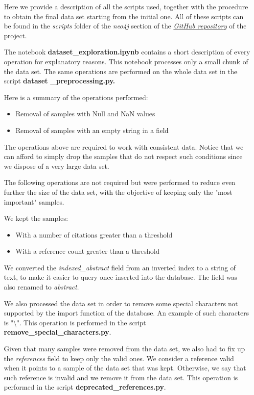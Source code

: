 \documentclass{Configuration_Files/PoliMi3i_thesis}
\begin{document}
Here we provide a description of all the scripts used, together with the procedure to obtain the final data set starting from the initial one. All of these scripts can be found in the \textit{scripts} folder of the \textit{neo4j} section of the \href{https://github.com/albertopirillo/smbud-project-2022}{\textit{GitHub repository}} of the project.

The notebook \textbf{dataset\_exploration.ipynb} contains a short description of every operation for explanatory reasons. This notebook processes only a small chunk of the data set. The same operations are performed on the whole data set in the script \textbf{dataset} \textbf{\_preprocessing.py.}

Here is a summary of the operations performed:
\begin{itemize}
    \item Removal of samples with Null and NaN values
    \item Removal of samples with an empty string in a field
\end{itemize}

The operations above are required to work with consistent data. Notice that we can afford to simply drop the samples that do not respect such conditions since we dispose of a very large data set.

The following operations are not required but were performed to reduce even further the size of the data set, with the objective of keeping only the "most important" samples. 

We kept the samples:
\begin{itemize}
    \item With a number of citations greater than a threshold
    \item With a reference count greater than a threshold
\end{itemize}

We converted the \textit{indexed\_abstract} field from an inverted index to a string of text, to make it easier to query once inserted into the database. The field was also renamed to \textit{abstract}.

We also processed the data set in order to remove some special characters not supported by the import function of the database. An example of such characters is "{\textbackslash}". This operation is performed in the script \textbf{remove\_special\_characters.py}.

Given that many samples were removed from the data set, we also had to fix up the \textit{references} field to keep only the valid ones. We consider a reference valid when it points to a sample of the data set that was kept. Otherwise, we say that such reference is invalid and we remove it from the data set. This operation is performed in the script \textbf{deprecated\_references.py}.
\end{document}
